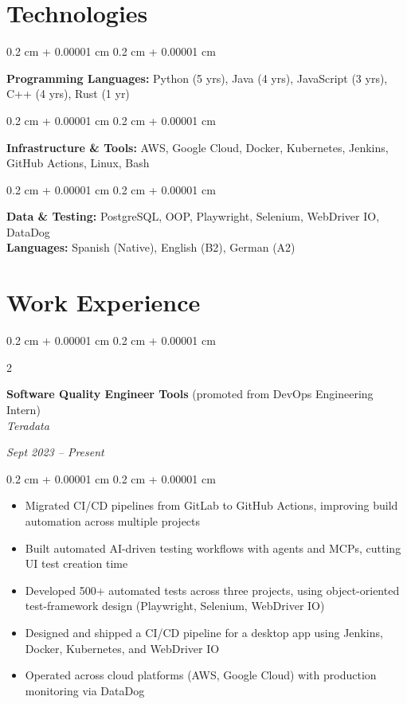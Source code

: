 \documentclass[10pt, letterpaper]{article}
\newenvironment{onecolentry}{
    \begin{adjustwidth}{
        0.2 cm + 0.00001 cm
    }{
        0.2 cm + 0.00001 cm
    }
}{
    \end{adjustwidth}
} %
\newenvironment{twocolentry}[2][]{
    \onecolentry
    \def\secondColumn{#2}
    \setcolumnwidth{\fill, 4.5 cm}
    \begin{paracol}{2}
}{
    \switchcolumn \raggedleft \secondColumn
    \end{paracol}
    \endonecolentry
} %
\begin{document}
    \section{Technologies}
        \begin{onecolentry}
            \textbf{Programming Languages:} 
            Python (5 yrs), Java (4 yrs), JavaScript (3 yrs), C++ (4 yrs), Rust (1 yr)
        \end{onecolentry}
        \vspace{0.10 cm}
        \begin{onecolentry}
            \textbf{Infrastructure \& Tools:} AWS, Google Cloud, Docker, Kubernetes, Jenkins, GitHub Actions, Linux, Bash
        \end{onecolentry}
        \vspace{0.10 cm}
        \begin{onecolentry}
            \textbf{Data \& Testing:} PostgreSQL, OOP, Playwright, Selenium, WebDriver IO, DataDog \\
             \textbf{Languages:} Spanish (Native), English (B2), German (A2)
        \end{onecolentry}

    \section{Work Experience}

    \begin{twocolentry}{
    \textit{Sept 2023 – Present}}
        \textbf{Software Quality Engineer Tools} (promoted from DevOps Engineering Intern) \\
        \textit{Teradata}
    \end{twocolentry}
    \begin{onecolentry}
        \begin{itemize}
            \item Migrated CI/CD pipelines from GitLab to GitHub Actions, improving build automation across multiple projects
            \item Built automated AI-driven testing workflows with agents and MCPs, cutting UI test creation time
            \item Developed 500+ automated tests across three projects, using object-oriented test-framework design (Playwright, Selenium, WebDriver IO)
            \item Designed and shipped a CI/CD pipeline for a desktop app using Jenkins, Docker, Kubernetes, and WebDriver IO
            \item Operated across cloud platforms (AWS, Google Cloud) with production monitoring via DataDog
        \end{itemize}
    \end{onecolentry}
\end{document}
